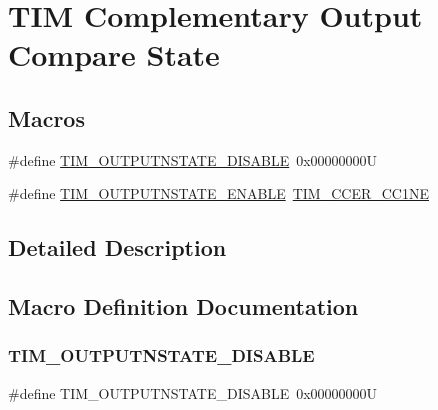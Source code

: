 \hypertarget{group___t_i_m___output___compare___n___state}{}\section{T\+IM Complementary Output Compare State}
\label{group___t_i_m___output___compare___n___state}
\subsection*{Macros}
\begin{DoxyCompactItemize}
\item 
\#define \mbox{\hyperlink{group___t_i_m___output___compare___n___state_ga07bb7288fc4ed155301a3276908a23a0}{T\+I\+M\+\_\+\+O\+U\+T\+P\+U\+T\+N\+S\+T\+A\+T\+E\+\_\+\+D\+I\+S\+A\+B\+LE}}~0x00000000U
\item 
\#define \mbox{\hyperlink{group___t_i_m___output___compare___n___state_ga3323d8c81a7f3940aa290d160dea3e0d}{T\+I\+M\+\_\+\+O\+U\+T\+P\+U\+T\+N\+S\+T\+A\+T\+E\+\_\+\+E\+N\+A\+B\+LE}}~\mbox{\hyperlink{group___peripheral___registers___bits___definition_ga813056b3f90a13c4432aeba55f28957e}{T\+I\+M\+\_\+\+C\+C\+E\+R\+\_\+\+C\+C1\+NE}}
\end{DoxyCompactItemize}


\subsection{Detailed Description}


\subsection{Macro Definition Documentation}
\mbox{\label{group___t_i_m___output___compare___n___state_ga07bb7288fc4ed155301a3276908a23a0}} 
\subsubsection{\texorpdfstring{TIM\_OUTPUTNSTATE\_DISABLE}{TIM\_OUTPUTNSTATE\_DISABLE}}
{\footnotesize\ttfamily \#define T\+I\+M\+\_\+\+O\+U\+T\+P\+U\+T\+N\+S\+T\+A\+T\+E\+\_\+\+D\+I\+S\+A\+B\+LE~0x00000000U}

